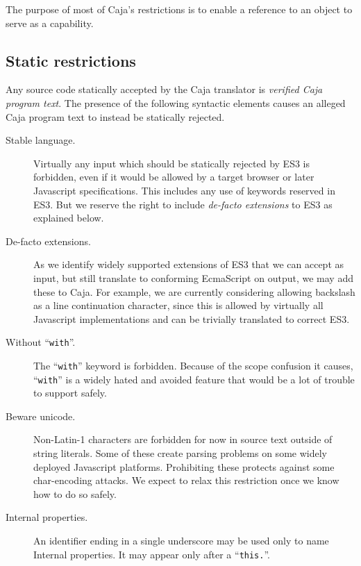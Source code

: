 \documentclass[letterpaper,twocolumn,10pt]{article}
\newcommand{\code}[1]{{\tt {#1}}}              %
\begin{document}
The purpose of most of Caja's restrictions is to enable a reference to an 
object to serve as a capability.

\subsection{Static restrictions}

Any source code statically accepted by the Caja translator is \emph{verified 
Caja program text}. The presence of the following syntactic elements causes 
an alleged Caja program text to instead be statically rejected.

\begin{description}

    \item[Stable language.] Virtually any input which should be statically 
    rejected by ES3 is forbidden, even if it would be allowed by a target 
    browser or later Javascript specifications. This includes any use of 
    keywords reserved in ES3. But we reserve the right to include 
    \emph{de-facto extensions} to ES3 as explained below.
    
    \item[De-facto extensions.] As we identify widely supported extensions of 
    ES3 that we can accept as input, but still translate to conforming 
    EcmaScript on output, we may add these to Caja. For example, we are 
    currently considering allowing backslash as a line continuation 
    character, since this is allowed by virtually all Javascript 
    implementations and can be trivially translated to correct ES3.

    \item[Without ``\code{with}''.] The ``\code{with}'' keyword is forbidden. 
    Because of the scope confusion it causes, ``\code{with}'' is a widely 
    hated and avoided feature that would be a lot of trouble to support 
    safely.

    \item[Beware unicode.] Non-Latin-1 characters are forbidden for now in 
    source text outside of string literals. Some of these create parsing 
    problems on some widely deployed Javascript platforms. Prohibiting these 
    protects against some char-encoding attacks. We expect to relax this 
    restriction once we know how to do so safely.

    \item[Internal properties.] An identifier ending in a single underscore 
    may be used only to name Internal properties. It may appear only after a 
    ``\code{this.}''.


\end{description}
\end{document}
